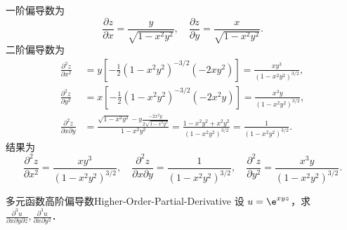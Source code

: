 \begin{solution}
    一阶偏导数为
    \begin{equation}
        \frac{\partial z}{\partial x} = \frac{y}{\sqrt{1-x^{2}y^{2}}}, \quad \frac{\partial z}{\partial y} = \frac{x}{\sqrt{1-x^{2}y^{2}}}.
    \end{equation}
    二阶偏导数为
    \begin{equation}
        \begin{aligned}
            \frac{\partial^{2} z}{\partial x^{2}}        & = y \left[ -\frac{1}{2}(1-x^{2}y^{2})^{-3/2}(-2xy^{2}) \right] = \frac{xy^{3}}{(1-x^{2}y^{2})^{3/2}},                                                                           \\
            \frac{\partial^{2} z}{\partial y^{2}}        & = x \left[ -\frac{1}{2}(1-x^{2}y^{2})^{-3/2}(-2x^{2}y) \right] = \frac{x^{3}y}{(1-x^{2}y^{2})^{3/2}},                                                                           \\
            \frac{\partial^{2} z}{\partial x \partial y} & = \frac{\sqrt{1-x^{2}y^{2}} - y \frac{-2x^{2}y}{2\sqrt{1-x^{2}y^{2}}}}{1-x^{2}y^{2}} = \frac{1-x^{2}y^{2} + x^{2}y^{2}}{(1-x^{2}y^{2})^{3/2}} = \frac{1}{(1-x^{2}y^{2})^{3/2}}.
        \end{aligned}
    \end{equation}
    结果为
    \begin{equation}
        \boxed{\frac{\partial^{2} z}{\partial x^{2}} = \frac{xy^{3}}{(1-x^{2}y^{2})^{3/2}}, \quad \frac{\partial^{2} z}{\partial x \partial y} = \frac{1}{(1-x^{2}y^{2})^{3/2}}, \quad \frac{\partial^{2} z}{\partial y^{2}} = \frac{x^{3}y}{(1-x^{2}y^{2})^{3/2}}.}
    \end{equation}
\end{solution}

\begin{problem}{多元函数高阶偏导数}{Higher-Order-Partial-Derivative}
    设 $u = \e^{xyz}$，求 $\frac{\partial^{3} u}{\partial x \partial y \partial z}, \frac{\partial^{3} u}{\partial x \partial y^{2}}$．
\end{problem}

